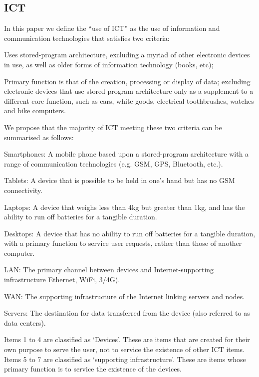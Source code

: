 \documentclass[conference]{IEEEtran}
\begin{document}
\subsection{ICT}

In this paper we define the ``use of ICT'' as the use of information and
communication technologies that satisfies two criteria:

\begin{compactitem}
\item Uses stored-program architecture, excluding a myriad of other
  electronic devices in use, as well as older forms of information
  technology (books, etc);
\item Primary function is that of the creation, processing or display
  of data; excluding electronic devices that use stored-program
  architecture only as a supplement to a different core function, such
  as cars, white goods, electrical toothbrushes, watches and bike
  computers.
\end{compactitem}

We propose that the majority of ICT meeting these two criteria can be
summarised as follows:

\begin{compactenum}
\item Smartphones: A mobile phone based upon a stored-program
  architecture with a range of communication technologies (e.g. GSM, GPS,
  Bluetooth, etc.).
\item Tablets: A device that is possible to be held in one's hand but
  has no GSM connectivity.
\item Laptops: A device that weighs less than 4kg but greater
  than 1kg, and has the ability to run off batteries for a
  tangible duration.
\item Desktops: A device that has no ability to run off batteries for
  a tangible duration, with a primary function to service
  user requests, rather than those of another computer.
\item LAN: The primary channel between devices and Internet-supporting
  infrastructure Ethernet, WiFi, 3/4G).
\item WAN: The supporting infrastructure of the Internet linking
  servers and nodes.
\item Servers: The destination for data transferred from the device
  (also referred to as data centers).
\end{compactenum}

Items 1 to 4 are classified as `Devices'. These are items that are
created for their own purpose to serve the user, not to service the
existence of other ICT items. Items 5 to 7 are classified as
`supporting infrastructure'. These are items whose primary function is
to service the existence of the devices.
\end{document}

